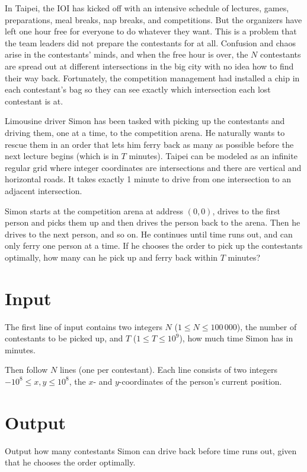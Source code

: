 In Taipei, the IOI has kicked off with an intensive schedule of lectures, games,
preparations, meal breaks, nap breaks, and competitions. But the organizers have left
one hour free for everyone to do whatever they want. This is a problem that the team leaders
did not prepare the contestants for at all. Confusion and chaos arise in the contestants'
minds, and when the free hour is over, the $N$ contestants are spread out at
different intersections in the big city with no idea how to find their way
back. Fortunately, the competition management had installed a chip in each
contestant's bag so they can see exactly which intersection each
lost contestant is at.

Limousine driver Simon has been tasked with picking up the contestants and driving
them, one at a time, to the competition arena. He naturally wants to rescue them in an
order that lets him ferry back as many as possible before
the next lecture begins (which is in $T$ minutes). Taipei can be modeled
as an infinite regular grid where integer coordinates are intersections and
there are vertical and horizontal roads. It takes exactly 1 minute to drive from
one intersection to an adjacent intersection.

Simon starts at the competition arena at address $(0, 0)$, drives to the first
person and picks them up and then drives the person back to the arena. Then
he drives to the next person, and so on. He continues until time runs out, and
can only ferry one person at a time. If he chooses the order to pick up
the contestants optimally, how many can he pick up and ferry back
within $T$ minutes?

\section*{Input}
The first line of input contains two integers $N$ ($1 \leq N \leq 100\,000$), the number of contestants to be picked up, and $T$ ($1 \leq T \leq 10^9$), how much time Simon has in minutes.

Then follow $N$ lines (one per contestant). Each line consists of
two integers $-10^8 \leq x, y \leq 10^8$, the $x$- and $y$-coordinates of the person's
current position.

\section*{Output}
Output how many contestants Simon can drive back before time runs out,
given that he chooses the order optimally.

